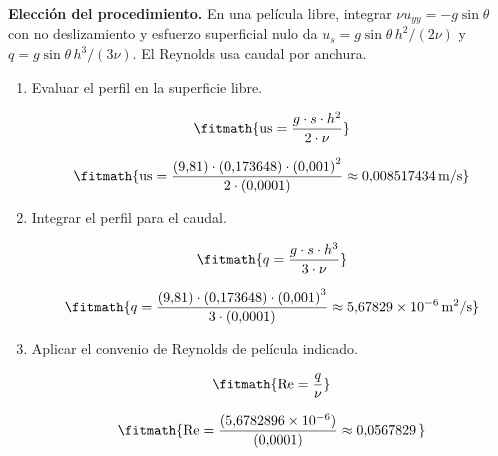 \noindent\textbf{Elección del procedimiento.} En una película libre, integrar $\nu u_{yy}=-g\sin\theta$ con no deslizamiento y esfuerzo superficial nulo da $u_s=g\sin\theta\,h^2/(2\nu)$ y $q=g\sin\theta\,h^3/(3\nu)$. El Reynolds usa caudal por anchura.

\begin{enumerate}

\item Evaluar el perfil en la superficie libre.

\[\fitmath{\mathrm{us}=\frac{g\cdot s\cdot {h}^{2}}{2\cdot \nu}}\]

\[\fitmath{\mathrm{us}=\frac{(9{,}81)\cdot (0{,}173648)\cdot {(0{,}001)}^{2}}{2\cdot (0{,}0001)}\approx 0{,}008517434\,\mathrm{m/s}}\]

\item Integrar el perfil para el caudal.

\[\fitmath{q=\frac{g\cdot s\cdot {h}^{3}}{3\cdot \nu}}\]

\[\fitmath{q=\frac{(9{,}81)\cdot (0{,}173648)\cdot {(0{,}001)}^{3}}{3\cdot (0{,}0001)}\approx 5{,}67829\times10^{-6}\,\mathrm{m^{2}/s}}\]

\item Aplicar el convenio de Reynolds de película indicado.

\[\fitmath{\mathrm{Re}=\frac{q}{\nu}}\]

\[\fitmath{\mathrm{Re}=\frac{(5{,}6782896\times10^{-6})}{(0{,}0001)}\approx 0{,}0567829\,}\]

\end{enumerate}
